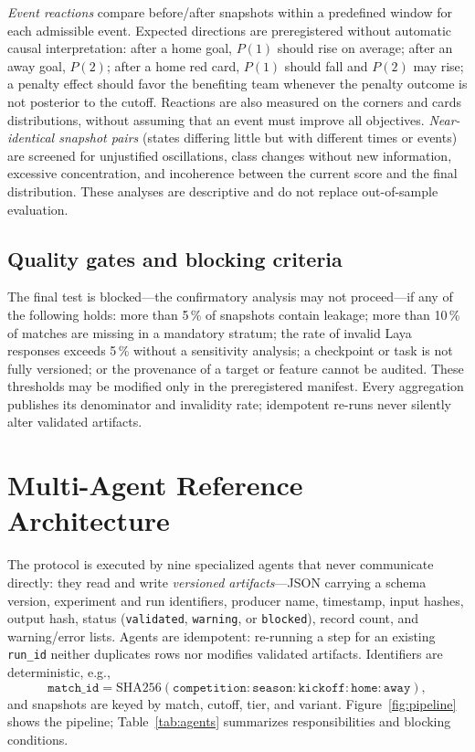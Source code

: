 \documentclass[11pt]{article}
\begin{document}
\emph{Event reactions} compare before/after snapshots within a predefined
window for each admissible event. Expected directions are preregistered
without automatic causal interpretation: after a home goal, $P(1)$ should rise
on average; after an away goal, $P(2)$; after a home red card, $P(1)$ should
fall and $P(2)$ may rise; a penalty effect should favor the benefiting team
whenever the penalty outcome is not posterior to the cutoff. Reactions are
also measured on the corners and cards distributions, without assuming that
an event must improve all objectives. \emph{Near-identical snapshot pairs}
(states differing little but with different times or events) are screened
for unjustified oscillations, class changes without new information,
excessive concentration, and incoherence between the current score and the
final distribution. These analyses are descriptive and do not replace
out-of-sample evaluation.

\subsection{Quality gates and blocking criteria}
\label{sec:gates}

The final test is blocked---the confirmatory analysis may not proceed---if
any of the following holds: more than 5\,\% of snapshots contain leakage; more
than 10\,\% of matches are missing in a mandatory stratum; the rate of invalid
Laya responses exceeds 5\,\% without a sensitivity analysis; a checkpoint or
task is not fully versioned; or the provenance of a target or feature cannot
be audited. These thresholds may be modified only in the preregistered
manifest. Every aggregation publishes its denominator and invalidity rate;
idempotent re-runs never silently alter validated artifacts.

\section{Multi-Agent Reference Architecture}
\label{sec:agents}

The protocol is executed by nine specialized agents that never communicate
directly: they read and write \emph{versioned artifacts}---JSON carrying a
schema version, experiment and run identifiers, producer name, timestamp,
input hashes, output hash, status (\texttt{validated}, \texttt{warning}, or
\texttt{blocked}), record count, and warning/error lists. Agents are
idempotent: re-running a step for an existing \texttt{run\_id} neither
duplicates rows nor modifies validated artifacts. Identifiers are
deterministic, e.g.,
\begin{equation}
\texttt{match\_id}=\mathrm{SHA256}(\texttt{competition}:\texttt{season}:
\texttt{kickoff}:\texttt{home}:\texttt{away}),
\end{equation}
and snapshots are keyed by match, cutoff, tier, and variant.
Figure~\ref{fig:pipeline} shows the pipeline; Table~\ref{tab:agents}
summarizes responsibilities and blocking conditions.
\end{document}
